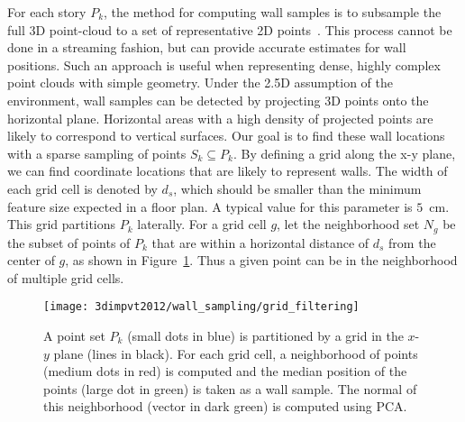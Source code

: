 \documentclass[12pt,onecolumn,oneside]{book}
\begin{document}
For each story $P_k$, the method for computing wall samples is to subsample the full 3D point-cloud to a set of representative 2D points~\cite{Turner12,Turner14,Turner14Journal,Okorn09}.  This process cannot be done in a streaming fashion, but can provide accurate estimates for wall positions.  Such an approach is useful when representing dense, highly complex point clouds with simple geometry.  Under the 2.5D assumption of the environment, wall samples can be detected by projecting 3D points onto the horizontal plane.  Horizontal areas with a high density of projected points are likely to correspond to vertical surfaces.  Our goal is to find these wall locations with a sparse sampling of points $S_k \subseteq P_k$.  By defining a grid along the x-y plane, we can find coordinate locations that are likely to represent walls.  The width of each grid cell is denoted by $d_s$, which should be smaller than the minimum feature size expected in a floor plan.  A typical value for this parameter is $5$~cm.  This grid partitions $P_k$ laterally.  For a grid cell $g$, let the neighborhood set $N_g$ be the subset of points of $P_k$ that are within a horizontal distance of $d_s$ from the center of $g$, as shown in Figure~\ref{fig:grid_filtering}.  Thus a given point can be in the neighborhood of multiple grid cells.

\begin{figure}

\begin{minipage}{1.0\linewidth}
  \centering
  \centerline{\texttt{[image: 3dimpvt2012/wall\_sampling/grid\_filtering]}}
\end{minipage}

\caption[Generating wall samples from 3D point clouds.]{A point set $P_k$ (small dots in blue) is partitioned by a grid in the $x$-$y$ plane (lines in black).  For each grid cell, a neighborhood of points (medium dots in red) is computed and the median position of the points (large dot in green) is taken as a wall sample.  The normal of this neighborhood (vector in dark green) is computed using PCA.}
\label{fig:grid_filtering}

\end{figure}
\end{document}
